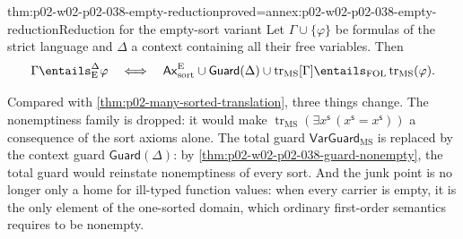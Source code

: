 \begin{hbtheorem}{thm:p02-w02-p02-038-empty-reduction}{proved=annex:p02-w02-p02-038-empty-reduction}{Reduction for the empty-sort variant}
Let \(\Gamma\cup\{\varphi\}\) be formulas of the strict language and
\(\Delta\) a context containing all their free variables.  Then
\[
 \Gamma\entails^{\Delta}_{\mathrm E}\varphi
 \quad\Longleftrightarrow\quad
 \mathsf{Ax}^{\mathrm E}_{\mathrm{sort}}\cup\mathsf{Guard}(\Delta)
   \cup\operatorname{tr}_{\mathrm{MS}}[\Gamma]
 \entails_{\mathrm{FOL}}\operatorname{tr}_{\mathrm{MS}}(\varphi).
\]
\end{hbtheorem}

Compared with \cref{thm:p02-many-sorted-translation}, three things change.
The nonemptiness family is dropped: it would make
\(\operatorname{tr}_{\mathrm{MS}}(\exists x^{\mathsf s}\,
(x^{\mathsf s}=x^{\mathsf s}))\) a consequence of the sort axioms alone.  The
total guard \(\mathsf{VarGuard}_{\mathrm{MS}}\) is replaced by the context
guard \(\mathsf{Guard}(\Delta)\): by
\cref{thm:p02-w02-p02-038-guard-nonempty}, the total guard would reinstate
nonemptiness of every sort.  And the junk point is no longer only a home for
ill-typed function values: when every carrier is empty, it is the only
element of the one-sorted domain, which ordinary first-order semantics
requires to be nonempty.

